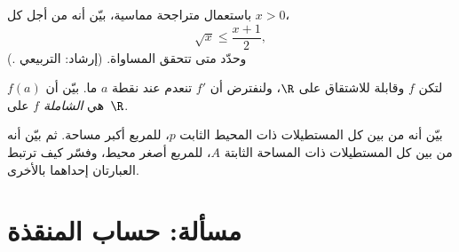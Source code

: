 \begin{exercise}[$\star\star$]\label{exo:g12:deriv:7}
باستعمال متراجحة مماسية، بيّن أنه من أجل كل $x > 0$،
\[
\sqrt{x} \leq \frac{x + 1}{2},
\]
وحدّد متى تتحقق المساواة. (إرشاد:  التربيعي .)
\end{exercise}

\begin{exercise}[$\star\star\star$]\label{exo:g12:deriv:8}
لتكن $f$  وقابلة للاشتقاق على $\R$، ولنفترض أن $f'$ تنعدم
عند نقطة $a$ ما. بيّن أن $f(a)$ هي  \emph{الشاملة}  $f$
على~$\R$.
\end{exercise}

\begin{exercise}[$\star\star\star$]\label{exo:g12:deriv:9}
بيّن أنه من بين كل المستطيلات ذات المحيط الثابت $p$، للمربع
أكبر مساحة. ثم بيّن أنه من بين كل المستطيلات ذات المساحة الثابتة $A$،
للمربع أصغر محيط، وفسّر كيف ترتبط العبارتان
إحداهما بالأخرى.
\end{exercise}

\section{مسألة: حساب المنقذة}

